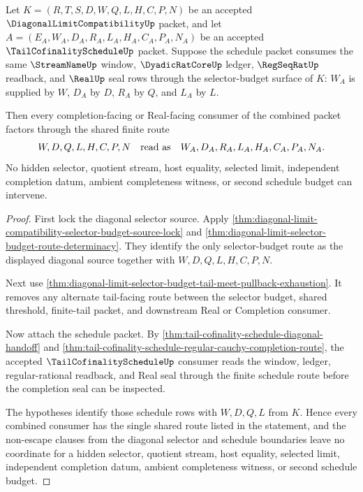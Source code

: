 
\begin{theorem}
\label{thm:diagonal-limit-selector-budget-pullback}
Let $K=(R,T,S,D,W,Q,L,H,C,P,N)$ be an accepted $\DiagonalLimitCompatibilityUp$ packet, and let $A=(E_A,W_A,D_A,R_A,L_A,H_A,C_A,P_A,N_A)$ be an accepted $\TailCofinalityScheduleUp$ packet. Suppose the schedule packet consumes the same $\StreamNameUp$ window, $\DyadicRatCoreUp$ ledger, $\RegSeqRatUp$ readback, and $\RealUp$ seal rows through the selector-budget surface of $K$: $W_A$ is supplied by $W$, $D_A$ by $D$, $R_A$ by $Q$, and $L_A$ by $L$.

Then every completion-facing or Real-facing consumer of the combined packet factors through the shared finite route
$$
W,D,Q,L,H,C,P,N
\quad\hbox{read as}\quad
W_A,D_A,R_A,L_A,H_A,C_A,P_A,N_A.
$$
No hidden selector, quotient stream, host equality, selected limit, independent completion datum, ambient completeness witness, or second schedule budget can intervene.
\end{theorem}
\begin{proof}
First lock the diagonal selector source. Apply \autoref{thm:diagonal-limit-compatibility-selector-budget-source-lock} and \autoref{thm:diagonal-limit-selector-budget-route-determinacy}. They identify the only selector-budget route as the displayed diagonal source together with $W,D,Q,L,H,C,P,N$.

Next use \autoref{thm:diagonal-limit-selector-budget-tail-meet-pullback-exhaustion}. It removes any alternate tail-facing route between the selector budget, shared threshold, finite-tail packet, and downstream Real or Completion consumer.

Now attach the schedule packet. By \autoref{thm:tail-cofinality-schedule-diagonal-handoff} and \autoref{thm:tail-cofinality-schedule-regular-cauchy-completion-route}, the accepted $\TailCofinalityScheduleUp$ consumer reads the window, ledger, regular-rational readback, and Real seal through the finite schedule route before the completion seal can be inspected.

The hypotheses identify those schedule rows with $W,D,Q,L$ from $K$. Hence every combined consumer has the single shared route listed in the statement, and the non-escape clauses from the diagonal selector and schedule boundaries leave no coordinate for a hidden selector, quotient stream, host equality, selected limit, independent completion datum, ambient completeness witness, or second schedule budget.
\end{proof}

